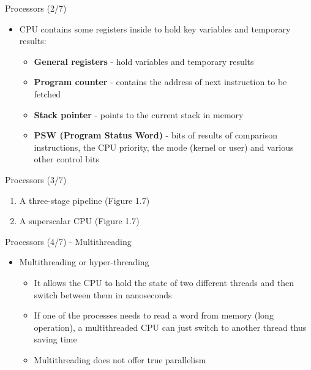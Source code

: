 \documentclass{beamer}
\begin{document}
\begin{frame}
{\centerline{Processors (2/7)}}
\begin{itemize}
    \item CPU contains some registers inside to hold key variables and temporary results:
    \begin{itemize}
        \item \textbf{General registers} - hold variables and temporary results
        \item \textbf{Program counter }- contains the address of next instruction to be fetched
        \item \textbf{Stack pointer} - points to the current stack in memory 
        \item \textbf{PSW (Program Status Word)} - bits of results of comparison instructions, the CPU priority, the mode (kernel or user) and various other control bits
    \end{itemize}
\end{itemize}
\end{frame}


\begin{frame}
{\centerline{Processors (3/7)}}
\begin{enumerate}[label=(\Alph*)]
    \item A three-stage pipeline (Figure 1.7)
    \begin{figure}
        
    \end{figure}
    \item A superscalar CPU (Figure 1.7)
        \begin{figure}
        
    \end{figure}
\end{enumerate}
\end{frame}


\begin{frame}
{\centerline{Processors (4/7) - Multithreading}}
\begin{itemize}
    \item Multithreading or hyper-threading
    \begin{itemize}
        \item It allows the CPU to hold the state of two different threads and then switch between them in nanoseconds
        \item If one of the processes needs to read a word from memory (long operation), a multithreaded CPU can just switch to another thread thus saving time 
        \item Multithreading does not offer true parallelism
    \end{itemize}
\end{itemize}
\end{frame}
\end{document}
